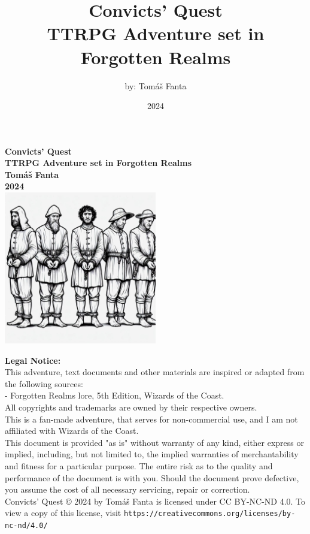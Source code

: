 \documentclass[10pt,twocolumn,twoside,openany,bg=full,layout=true,nomultitoc]{dndbook}
\begin{document}
\frontmatter
\title {Convicts' Quest\\ \large TTRPG Adventure set in Forgotten Realms}
\author {by: Tomáš Fanta}
\date {2024}



\begin{titlepage}
    \centering
    \textbf {\huge Convicts' Quest\\\large TTRPG Adventure set in Forgotten Realms\\}
    \textbf {Tomáš Fanta\\}
    \textbf {2024\\}
    \includegraphics[width=0.5\textwidth]{img/title}\\[1cm]
    \vspace{1.5cm}
    \begin{flushleft}
      \footnotesize
      \textbf{Legal Notice:}\\
      This adventure, text documents and other materials are inspired or adapted from the following sources:\\
      - Forgotten Realms lore, 5th Edition, Wizards of the Coast.\\
      All copyrights and trademarks are owned by their respective owners.\\
      This is a fan-made adventure, that serves for non-commercial use, and I am not affiliated with Wizards of the Coast.\\
      This document is provided "as is" without warranty of any kind, either express or implied, including, but not limited to,
      the implied warranties of merchantability and fitness for a particular purpose.
      The entire risk as to the quality and performance of the document is with you.
      Should the document prove defective, you assume the cost of all necessary servicing, repair or correction.\\
      Convicts' Quest © 2024 by Tomáš Fanta is licensed under CC BY-NC-ND 4.0. To view a copy of this license, visit \texttt{https://creativecommons.org/licenses/by-nc-nd/4.0/}
    \end{flushleft}
\end{titlepage}
\end{document}
